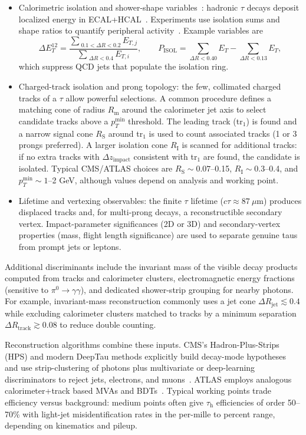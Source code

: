 \begin{itemize}
  \item Calorimetric isolation and shower-shape variables~\cite{dummy}: hadronic $\tau$ decays deposit localized energy in ECAL+HCAL~\cite{dummy}. Experiments use isolation sums and shape ratios to quantify peripheral activity~\cite{dummy}. Example variables are~\cite{dummy}
  \[
    \Delta E_T^{12}=\frac{\sum_{\;0.1<\Delta R<0.2} E_{T,j}}{\sum_{\;\Delta R<0.4} E_{T,i}},\qquad
    P_{\mathrm{ISOL}}=\sum_{\Delta R<0.40}E_T - \sum_{\Delta R<0.13}E_T,
  \]
  which suppress QCD jets that populate the isolation ring.
  \item Charged-track isolation and prong topology: the few, collimated charged tracks of a $\tau$ allow powerful selections. A common procedure defines a matching cone of radius $R_{\mathrm{m}}$ around the calorimeter jet axis to select candidate tracks above a $p_T^{\min}$ threshold. The leading track (tr$_1$) is found and a narrow signal cone $R_{\mathrm{S}}$ around tr$_1$ is used to count associated tracks (1 or 3 prongs preferred). A larger isolation cone $R_{\mathrm{I}}$ is scanned for additional tracks: if no extra tracks with $\Delta z_{\text{impact}}$ consistent with tr$_1$ are found, the candidate is isolated. Typical CMS/ATLAS choices are $R_{\mathrm{S}}\sim0.07$–0.15, $R_{\mathrm{I}}\sim0.3$–0.4, and $p_T^{\min}\sim1$–2 GeV, although values depend on analysis and working point.
  \item Lifetime and vertexing observables: the finite $\tau$ lifetime ($c\tau\approx87\ \mu\mathrm{m}$) produces displaced tracks and, for multi-prong decays, a reconstructible secondary vertex. Impact-parameter significances (2D or 3D) and secondary-vertex properties (mass, flight length significance) are used to separate genuine taus from prompt jets or leptons.
\end{itemize}

Additional discriminants include the invariant mass of the visible decay products computed from tracks and calorimeter clusters, electromagnetic energy fractions (sensitive to $\pi^0\to\gamma\gamma$), and dedicated shower-strip grouping for nearby photons. For example, invariant-mass reconstruction commonly uses a jet cone $\Delta R_{\text{jet}}\lesssim0.4$ while excluding calorimeter clusters matched to tracks by a minimum separation $\Delta R_{\text{track}}\gtrsim0.08$ to reduce double counting.

Reconstruction algorithms combine these inputs. CMS's Hadron-Plus-Strips (HPS) and modern DeepTau methods explicitly build decay-mode hypotheses and use strip-clustering of photons plus multivariate or deep-learning discriminators to reject jets, electrons, and muons~\parencite{CMS:2022ydz,CMS_DeepTau}. ATLAS employs analogous calorimeter+track based MVAs and BDTs~\parencite{ATLAS:2022fgo}. Typical working points trade efficiency versus background: medium points often give $\tau_{\mathrm{h}}$ efficiencies of order 50–70\% with light-jet misidentification rates in the per-mille to percent range, depending on kinematics and pileup.


